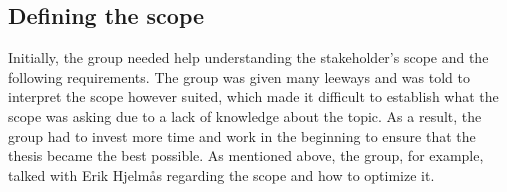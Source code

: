 \subsection{Defining the scope}
Initially, the group needed help understanding the stakeholder's scope and the following requirements. The group was given many leeways and was told to interpret the scope however suited, which made it difficult to establish what the scope was asking due to a lack of knowledge about the topic. As a result, the group had to invest more time and work in the beginning to ensure that the thesis became the best possible. As mentioned above, the group, for example, talked with Erik Hjelmås regarding the scope and how to optimize it. 

